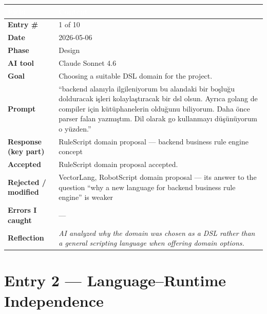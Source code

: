 \documentclass[a4paper,10pt]{article}
\begin{document}
\begin{tabular}{|
    >{\bfseries}m{3.5cm}|
    m{10cm}|
}
\hline
\rowcolor{headerblue}
\textcolor{white}{Field} & \textcolor{white}{\textbf{Content}} \\
\hline
\rowcolor{white}
Entry \#        & 1 of 10 \\
\hline
\rowcolor{altrow}
Date            & 2026-05-06 \\
\hline
\rowcolor{white}
Phase           & Design \\
\hline
\rowcolor{altrow}
AI tool         & Claude Sonnet 4.6 \\
\hline
\rowcolor{white}
Goal            & Choosing a suitable DSL domain for the project. \\
\hline
\rowcolor{altrow}
Prompt          & ``backend alanıyla ilgileniyorum bu alandaki bir boşluğu dolduracak işleri kolaylaştıracak bir dsl olsun. Ayrıca golang de compiler için kütüphanelerin olduğunu biliyorum. Daha önce parser falan yazmıştım. Dil olarak go kullanmayı düşünüyorum o yüzden.'' \\
\hline
\rowcolor{white}
Response (key part) & RuleScript domain proposal --- backend business rule engine concept \\
\hline
\rowcolor{altrow}
Accepted        & RuleScript domain proposal accepted. \\
\hline
\rowcolor{white}
Rejected / modified & VectorLang, RobotScript domain proposal --- its answer to the question ``why a new language for backend business rule engine'' is weaker \\
\hline
\rowcolor{altrow}
Errors I caught   & --- \\
\hline
\rowcolor{white}
Reflection & \textit{AI analyzed why the domain was chosen as a DSL rather than a general scripting language when offering domain options.} \\
\hline
\end{tabular}

\newpage

\section{Entry 2 --- Language--Runtime Independence}
\end{document}

